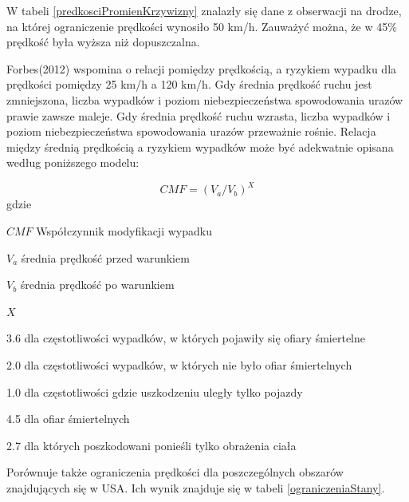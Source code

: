 W tabeli \ref{predkosciPromienKrzywizny} znalazły się dane z obserwacji na drodze, na której ograniczenie prędkości wynosiło 50 km/h. Zauważyć można, że w 45\% prędkość była wyższa niż  dopuszczalna.

Forbes(2012) wspomina o relacji pomiędzy prędkością, a ryzykiem wypadku dla prędkości pomiędzy 25 km/h a 120 km/h. Gdy średnia prędkość ruchu jest zmniejszona, liczba wypadków i  poziom niebezpieczeństwa spowodowania urazów prawie zawsze maleje. Gdy średnia prędkość ruchu wzrasta, liczba wypadków i poziom niebezpieczeństwa spowodowania urazów przeważnie rośnie. Relacja między średnią prędkością a ryzykiem wypadków może być adekwatnie opisana według poniższego modelu:

\begin{equation}
CMF = (V_a / V_b)^X
\end{equation}
gdzie
\begin{eqwhere}[2cm]
	\item[$CMF$] Współczynnik modyfikacji wypadku
	\item[$V_a$] średnia prędkość przed warunkiem
	\item[$V_b$] średnia prędkość po warunkiem
	\item[$X$] \begin{itemize}
		3.6 dla częstotliwości wypadków, w których pojawiły się ofiary śmiertelne
		
		2.0 dla częstotliwości wypadków, w których nie było ofiar śmiertelnych
		
		1.0 dla częstotliwości gdzie uszkodzeniu uległy tylko pojazdy
		
		4.5 dla ofiar śmiertelnych
		
		2.7 dla których poszkodowani ponieśli tylko obrażenia ciała
	\end{itemize}

\end{eqwhere}
Porównuje także ograniczenia prędkości dla poszczególnych obszarów znajdujących się w USA. Ich wynik znajduje się w tabeli \ref{ograniczeniaStany}.

